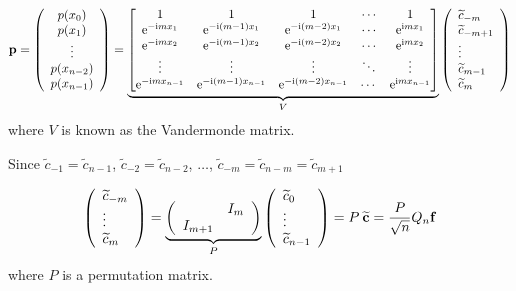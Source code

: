 \documentclass[12pt,landscape]{article}
\begin{document}
{\[
\mathbf{p} = \left(
\begin{array}{c}
p(x_0) \\
p(x_1) \\
\vdots \\
p(x_{n-2}) \\
p(x_{n-1})
\end{array}
\right)
=
\underbrace{\begin{bmatrix}
1 & 1 & 1&  \ensuremath{\cdots} & 1 \\
{\rm e}^{-{\rm i}m x_1} & {\rm e}^{-{\rm i}(m-1) x_1} &  {\rm e}^{-{\rm i}(m-2) x_1} & \ensuremath{\cdots} & {\rm e}^{{\rm i} m x_1} \\
{\rm e}^{-{\rm i}m x_2} & {\rm e}^{-{\rm i}(m-1) x_2} &  {\rm e}^{-{\rm i}(m-2) x_2} & \ensuremath{\cdots} & {\rm e}^{{\rm i} m x_2} \\
\ensuremath{\vdots} & \ensuremath{\vdots} & \ensuremath{\vdots} & \ensuremath{\ddots} & \ensuremath{\vdots} \\
{\rm e}^{-{\rm i}m x_{n-1}}& {\rm e}^{-{\rm i}(m-1)x_{n-1}}& {\rm e}^{-{\rm i}(m-2)x_{n-1}}& \cdots & {\rm e}^{{\rm i}m x_{n-1}}
\end{bmatrix}}_{V} 
\left(
\begin{array}{l}
\widetilde{c}_{-m} \\
\widetilde{c}_{-m+1} \\
\vdots \\
\widetilde{c}_{m-1} \\
\widetilde{c}_{m}
\end{array}
\right)
\]
where $V$ is known as the Vandermonde matrix.

Since $\widetilde{c}_{-1} = \widetilde{c}_{n-1}$, $\widetilde{c}_{-2} = \widetilde{c}_{n-2}$, $\ldots$, $\widetilde{c}_{-m} = \widetilde{c}_{n-m} = \widetilde{c}_{m+1}$

\[
\left(
\begin{array}{l}
\widetilde{c}_{-m} \\
\vdots \\
\widetilde{c}_{m}
\end{array}
\right) = 
\underbrace{\left(
\begin{array}{c c}
   & I_{m} \\
I_{m+1} & 
\end{array}
\right)}_{P}
\left(
\begin{array}{l}
\widetilde{c}_{0} \\
\vdots \\
\widetilde{c}_{n-1}
\end{array}
\right) = P\: \widetilde{\mathbf{c}} = \frac{P}{\sqrt{n}}Q_{n}\mathbf{f}
\]
where $P$ is a permutation matrix.

}
\end{document}

